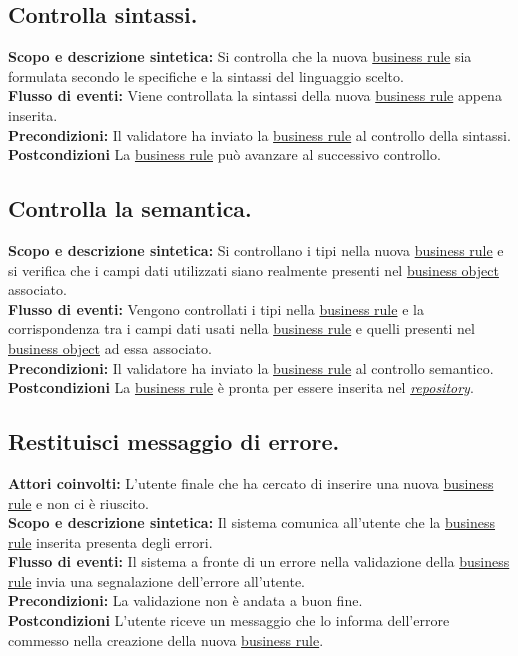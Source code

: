 \subsection{Controlla sintassi.}
\textbf{Scopo e descrizione sintetica:} Si controlla che la nuova \underline{business rule} sia formulata secondo le specifiche e la sintassi del linguaggio scelto.\\
\textbf{Flusso di eventi:} Viene controllata la sintassi della nuova \underline{business rule} appena inserita.\\
\textbf{Precondizioni:} Il validatore ha inviato la \underline{business rule} al controllo della sintassi.\\
\textbf{Postcondizioni} La \underline{business rule} pu\`o avanzare al successivo controllo.

\subsection{Controlla la semantica.}
\textbf{Scopo e descrizione sintetica:} Si controllano i tipi nella nuova \underline{business rule} e si verifica che i campi dati utilizzati siano realmente presenti nel \underline{business object} associato.\\
\textbf{Flusso di eventi:} Vengono controllati i tipi nella \underline{business rule} e la corrispondenza tra i campi dati usati nella \underline{business rule} e quelli presenti nel \underline{business object} ad essa associato.\\
\textbf{Precondizioni:} Il validatore ha inviato la \underline{business rule} al controllo semantico.\\
\textbf{Postcondizioni} La \underline{business rule} \`e pronta per essere inserita nel \textit{\underline{repository}}.

\subsection{Restituisci messaggio di errore.}
\textbf{Attori coinvolti:} L'utente finale che ha cercato di inserire una nuova \underline{business rule} e non ci \`e riuscito.\\
\textbf{Scopo e descrizione sintetica:} Il sistema comunica all'utente che la \underline{business rule} inserita presenta degli errori.\\
\textbf{Flusso di eventi:} Il sistema  a fronte di un errore nella validazione della \underline{business rule} invia una segnalazione dell'errore all'utente.\\
\textbf{Precondizioni:} La validazione non \`e andata a buon fine.\\
\textbf{Postcondizioni} L'utente riceve un messaggio che lo informa dell'errore commesso nella creazione della nuova \underline{business rule}.

